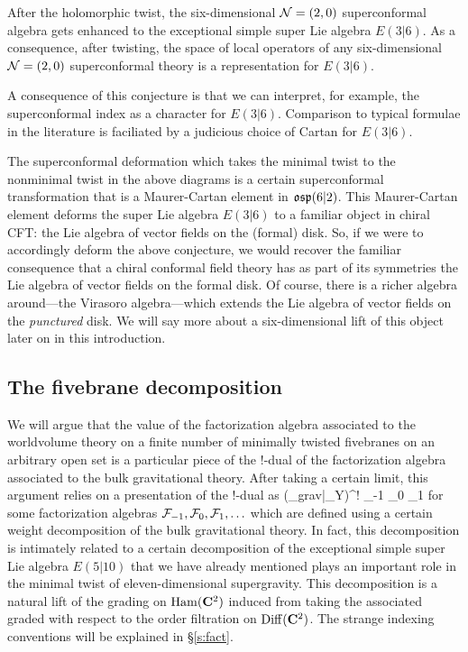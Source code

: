 \begin{conj}
After the holomorphic twist, the six-dimensional $\mathcal N = (2,0) $ superconformal algebra gets enhanced to the exceptional simple super Lie algebra $E(3|6)$.
As a consequence, after twisting, the space of local operators of any six-dimensional $\mathcal N=(2,0)$ superconformal theory is a representation for $E(3|6)$.
\end{conj}

A consequence of this conjecture is that we can interpret, for example, the superconformal index as a character for $E(3|6)$. Comparison to typical formulae in the literature is faciliated by a judicious choice of Cartan for $E(3|6)$.

The superconformal deformation which takes the minimal twist to the nonminimal twist in the above diagrams is a certain superconformal transformation that is a Maurer-Cartan element in $\mathfrak{osp}(6|2)$. This Maurer-Cartan element deforms the super Lie algebra $E(3|6)$ to a familiar object in chiral CFT: the Lie algebra of vector fields on the (formal) disk.
So, if we were to accordingly deform the above conjecture, we would recover the familiar consequence that a chiral conformal field theory has as part of its symmetries the Lie algebra of vector fields on the formal disk.
Of course, there is a richer algebra around---the Virasoro algebra---which extends the Lie algebra of vector fields on the {\em punctured} disk. 
We will say more about a six-dimensional lift of this object later on in this introduction.

\subsection{The fivebrane decomposition}
We will argue that the value of the factorization algebra associated to the worldvolume theory on a finite number of minimally twisted fivebranes on an arbitrary open set is a particular piece of the $!$-dual of the factorization algebra associated to the bulk gravitational theory.
After taking a certain limit, this argument relies on a presentation of the $!$-dual as
\beqn
(\Obs_{grav}|_{Y})^{!} \simeq \cF_{-1} \otimes \cF_0 \otimes \cF_1 \otimes \cdots 
\eeqn
for some factorization algebras $\mathcal F_{-1},\mathcal F_0, \mathcal F_{1},\ldots$ which are defined using a certain weight decomposition of the bulk gravitational theory.
In fact, this decomposition is intimately related to a certain decomposition of the exceptional simple super Lie algebra $E(5|10)$ that we have already mentioned plays an important role in the minimal twist of eleven-dimensional supergravity. This decomposition is a natural lift of the grading on $\operatorname{Ham}(\mathbf{C}^{2})$ induced from taking the associated graded with respect to the order filtration on $\operatorname{Diff} (\mathbf{C}^{2})$. The strange indexing conventions will be explained in \S\ref{s:fact}.

